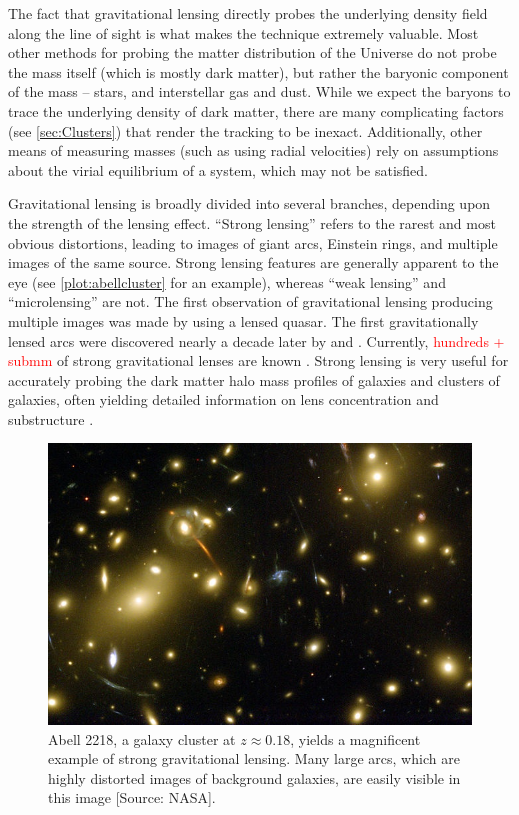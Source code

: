 The fact that gravitational lensing directly probes the underlying density field along the line of sight is what makes the technique extremely valuable. Most other methods for probing the matter distribution of the Universe do not probe the mass itself (which is mostly dark matter), but rather the baryonic component of the mass -- stars, and interstellar gas and dust. While we expect the baryons to trace the underlying density of dark matter, there are many complicating factors (see \autoref{sec:Clusters}) that render the tracking to be inexact. Additionally, other means of measuring masses (such as using radial velocities) rely on assumptions about the virial equilibrium of a system, which may not be satisfied.

Gravitational lensing is broadly divided into several branches, depending upon the strength of the lensing effect. ``Strong lensing'' refers to the rarest and most obvious distortions, leading to images of giant arcs, Einstein rings, and multiple images of the same source. Strong lensing features are generally apparent to the eye (see \autoref{plot:abellcluster} for an example), whereas ``weak lensing'' and ``microlensing'' are not. The first observation of gravitational lensing producing multiple images was made by \citet{Walsh79} using a lensed quasar. The first gravitationally lensed arcs were discovered nearly a decade later by \citet{Lynds86} and \citet{Soucail87,Soucail88}. Currently, \textcolor{red}{hundreds + submm} of strong gravitational lenses are known \citep{Browne03,Bolton08,Bayliss12}. Strong lensing is very useful for accurately probing the dark matter halo mass profiles of galaxies and clusters of galaxies, often yielding detailed information on lens concentration \citep{Auger10} and substructure \citep{Mao98,Dalal02}. 

\begin{figure}
\begin{center}
\includegraphics[scale=1.5]{plots_intro/Abell2218_Med.jpg}
\caption[Strong Lensing Image]{Abell 2218, a galaxy cluster at $z \approx 0.18$, yields a magnificent example of strong gravitational lensing. Many large arcs, which are highly distorted images of background galaxies, are easily visible in this image [Source: NASA].}
\label{plot:abellcluster}
\end{center}
\end{figure}

